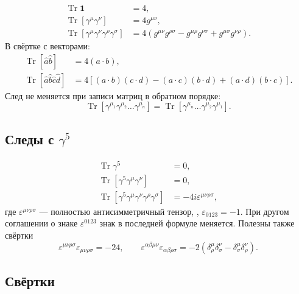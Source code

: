 \documentclass[../final.tex]{subfiles}
\begin{document}
\begin{align*}
    \operatorname{Tr}\mathbf 1&=4,\\
    \operatorname{Tr}\left[\gamma^\mu\gamma^\nu\right]&=4g^{\mu\nu},\\
    \operatorname{Tr}\left[\gamma^\mu\gamma^\nu\gamma^\rho\gamma^\sigma\right]
    &=4\left(g^{\mu\nu}g^{\rho\sigma}-g^{\mu\rho}g^{\nu\sigma}
    +g^{\mu\sigma}g^{\nu\rho}\right).
\end{align*}
В свёртке с векторами:
\begin{align*}
    \operatorname{Tr}[\hat a\hat b]&=4(a\cdot b),\\
    \operatorname{Tr}[\hat a\hat b\hat c\hat d]
    &=4\left[(a\cdot b)(c\cdot d)-(a\cdot c)(b\cdot d)+(a\cdot d)(b\cdot c)\right].
\end{align*}
След не меняется при записи матриц в обратном порядке:
\begin{equation*}
    \operatorname{Tr}\left[\gamma^{\mu_1}\gamma^{\mu_2}\ldots\gamma^{\mu_n}\right]
    =\operatorname{Tr}\left[\gamma^{\mu_n}\ldots\gamma^{\mu_2}\gamma^{\mu_1}\right].
\end{equation*}

\subsection*{Следы с \texorpdfstring{$\gamma^5$}{γ5}}

\begin{align*}
    \operatorname{Tr}\gamma^5&=0,\\
    \operatorname{Tr}\left[\gamma^5\gamma^\mu\gamma^\nu\right]&=0,\\
    \operatorname{Tr}\left[\gamma^5\gamma^\mu\gamma^\nu\gamma^\rho\gamma^\sigma\right]
    &=-4i\varepsilon^{\mu\nu\rho\sigma},
\end{align*}
где $\varepsilon^{\mu\nu\rho\sigma}$ --- полностью антисимметричный тензор,
, $\varepsilon_{0123}=-1$.
При другом соглашении о знаке $\varepsilon^{0123}$ знак в последней формуле
меняется. Полезны также свёртки
\begin{equation*}
    \varepsilon^{\mu\nu\rho\sigma}\varepsilon_{\mu\nu\rho\sigma}=-24,
    \qquad
    \varepsilon^{\alpha\beta\mu\nu}\varepsilon_{\alpha\beta\rho\sigma}
    =-2\left(\delta^\mu_\rho\delta^\nu_\sigma-\delta^\mu_\sigma\delta^\nu_\rho\right).
\end{equation*}

\subsection*{Свёртки}
\end{document}
